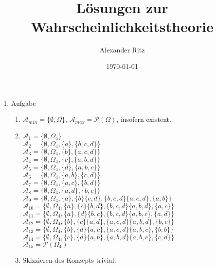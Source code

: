 \documentclass[12pt,a4paper]{article}
\title{Lösungen zur Wahrscheinlichkeitstheorie}
\author{Alexander Ritz}
\date{\today}
\begin{document}
\maketitle

\begin{enumerate}

\item Aufgabe 
\begin{enumerate}[label=(\roman*)]

\item $\mathscr{A}_{min} = \{\emptyset, \Omega\}$, $\mathscr{A}_{max} = \mathcal{P}(\Omega)$, insofern existent.

\item $\mathscr{A}_{1} = \{\emptyset, \Omega_4\}$ \\ $\mathscr{A}_{2} = \{\emptyset, \Omega_4, \{a\}, \{b, c, d\}\}$ \\ $\mathscr{A}_{3} = \{\emptyset, \Omega_4, \{b\}, \{a, c, d\}\}$ \\ $\mathscr{A}_{4} = \{\emptyset, \Omega_4, \{c\}, \{a, b, d\}\}$ \\ $\mathscr{A}_{5} = \{\emptyset, \Omega_4, \{d\}, \{a, b, c\}\}$ \\ $\mathscr{A}_{6} = \{\emptyset, \Omega_4, \{a, b\}, \{c, d\}\}$ \\ $\mathscr{A}_{7} = \{\emptyset, \Omega_4, \{a, c\}, \{b, d\}\}$ \\ $\mathscr{A}_{8} = \{\emptyset, \Omega_4, \{a, d\}, \{b, c\}\}$ \\ $\mathscr{A}_{9} = \{\emptyset, \Omega_4, \{a\}, \{b\} \{c, d\}, \{b, c, d\} \{a, c, d\}, \{a, b\}\}$ \\ $\mathscr{A}_{10} = \{\emptyset, \Omega_4, \{a\}, \{c\} \{b, d\}, \{b, c, d\} \{a, b, d\}, \{a, c\}\}$ \\ $\mathscr{A}_{11} = \{\emptyset, \Omega_4, \{a\}, \{d\} \{b, c\}, \{b, c, d\} \{a, b, c\}, \{a, d\}\}$ \\ $\mathscr{A}_{12} = \{\emptyset, \Omega_4, \{b\}, \{c\} \{a, d\}, \{a, c, d\} \{a, b, d\}, \{b, c\}\}$ \\ $\mathscr{A}_{13} = \{\emptyset, \Omega_4, \{b\}, \{d\} \{a, c\}, \{a, c, d\} \{a, b, c\}, \{b, b\}\}$ \\ $\mathscr{A}_{14} = \{\emptyset, \Omega_4, \{c\}, \{d\} \{a, b\}, \{a, b, d\} \{a, b, c\}, \{c, d\}\}$ \\ $\mathscr{A}_{15} = \mathcal{P}(\Omega_4)$ 

\item Skizzieren des Konzepts trivial.


\end{enumerate}
\end{enumerate}
\end{document}
